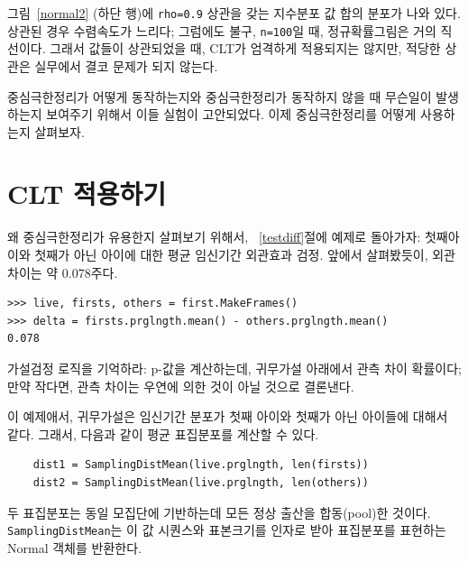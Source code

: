 
그림~\ref{normal2} (하단 행)에 {\tt rho=0.9} 상관을 갖는 지수분포 값 합의 분포가 나와 있다. 상관된 경우 수렴속도가 느리다; 그럼에도 불구, {\tt n=100}일 때, 정규확률그림은 거의 직선이다. 그래서 값들이 상관되었을 때, CLT가 엄격하게 적용되지는 않지만, 적당한 상관은 실무에서 결코 문제가 되지 않는다.

중심극한정리가 어떻게 동작하는지와 중심극한정리가 동작하지 않을 때 무슨일이 발생하는지 보여주기 위해서 이들 실험이 고안되었다. 이제 중심극한정리를 어떻게 사용하는지 살펴보자.


\section{CLT 적용하기}
\label{usingCLT}

왜 중심극한정리가 유용한지 살펴보기 위해서, ~\ref{testdiff}절에 예제로 돌아가자: 첫째아이와 첫째가 아닌 아이에 대한 평균 임신기간 외관효과 검정.
앞에서 살펴봤듯이, 외관 차이는 약 0.078주다.

\begin{verbatim}
>>> live, firsts, others = first.MakeFrames()
>>> delta = firsts.prglngth.mean() - others.prglngth.mean()
0.078
\end{verbatim}

가설검정 로직을 기억하라: p-값을 계산하는데, 귀무가설 아래에서 관측 차이 확률이다; 만약 작다면, 관측 차이는 우연에 의한 것이 아닐 것으로 결론낸다.

이 예제애서, 귀무가설은 임신기간 분포가 첫째 아이와 첫째가 아닌 아이들에 대해서 같다. 그래서, 다음과 같이 평균 표집분포를 계산할 수 있다.

\begin{verbatim}
    dist1 = SamplingDistMean(live.prglngth, len(firsts))
    dist2 = SamplingDistMean(live.prglngth, len(others))
\end{verbatim}

두 표집분포는 동일 모집단에 기반하는데 모든 정상 출산을 합동(pool)한 것이다. {\tt SamplingDistMean}는 이 값 시퀀스와 표본크기를 인자로 받아 표집분포를 표현하는 Normal 객체를 반환한다.

